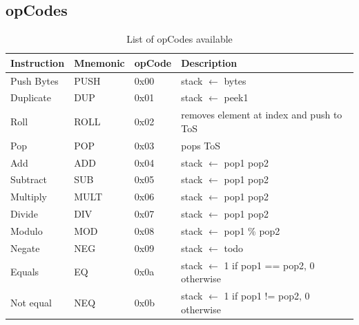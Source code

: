 \subsection{opCodes}
\begin{table}[]
\centering
\caption{List of opCodes available}
\label{opcodes cheat sheet}
\begin{tabular}{@{}llll@{}}
\toprule
\textbf{Instruction} & \textbf{Mnemonic} & \textbf{opCode} & \textbf{Description}                                     \\ \midrule
Push Bytes           & PUSH              & 0x00            & stack $\leftarrow$ bytes                                            \\
Duplicate            & DUP               & 0x01            & stack $\leftarrow$ peek1                           \\
Roll                 & ROLL              & 0x02            & removes element at index and push to ToS           \\
Pop                  & POP               & 0x03            & pops ToS                                                 \\
Add                  & ADD               & 0x04            & stack $\leftarrow$ pop1 \+ pop2                                      \\
Subtract             & SUB               & 0x05            & stack $\leftarrow$ pop1 \- pop2                                      \\
Multiply             & MULT              & 0x06            & stack $\leftarrow$ pop1 \* pop2                                      \\
Divide               & DIV               & 0x07            & stack $\leftarrow$ pop1 \/ pop2                                      \\
Modulo               & MOD               & 0x08            & stack $\leftarrow$ pop1 \% pop2                                     \\
Negate               & NEG               & 0x09            & stack $\leftarrow$ todo                                             \\
Equals               & EQ                & 0x0a            & stack $\leftarrow$ 1 if pop1 == pop2, 0 otherwise                   \\
Not equal            & NEQ               & 0x0b            & stack $\leftarrow$ 1 if pop1 != pop2, 0 otherwise                   \\

\end{tabular}
\end{table}
